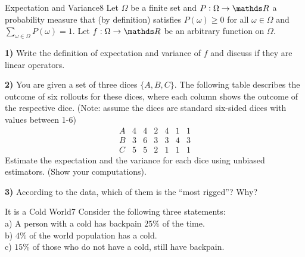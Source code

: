 \newif\ifvimbug
\vimbugfalse

\ifvimbug

\fi

 

\begin{questions}


\begin{question}{Expectation and Variance}{8}
Let $\Omega$ be a finite set and $P:\Omega\rightarrow\R$ a probability measure that (by definition) satisfies $P(\omega)\geq0$ for all $\omega\in\Omega$ and $\sum_{\omega\in\Omega}P(\omega)=1$. 
Let $f:\Omega\rightarrow\R$ be an arbitrary function on $\Omega$.

\textbf{1)} Write the definition of expectation and variance of $f$ and discuss if they are linear operators.

\textbf{2)} You are given a set of three dices $\{A,B,C\}$.
The following table describes the outcome of six rollouts for these dices, where each column shows the outcome of the respective dice. 
(Note: assume the dices are standard six-sided dices with values between 1-6)
\begin{equation*}
\begin{array}{r|cccccc}
    A & 4 & 4 & 2 & 4 & 1 & 1 \\
    \hline
    B & 3 & 6 & 3 & 3 & 4 & 3 \\
    \hline
    C & 5 & 5 & 2 & 1 & 1 & 1 
\end{array}
\end{equation*}
Estimate the expectation and the variance for each dice using unbiased estimators. (Show your computations).

\textbf{3)} According to the data, which of them is the ``most rigged''? Why?

\begin{answer}\end{answer}

\end{question}


\begin{question}{It is a Cold World}{7}
Consider the following three statements:
\\
a) A person with a cold has backpain $25\%$ of the time.
\\
b) $4\%$ of the world population has a cold.
\\
c) $15\%$ of those who do not have a cold, still have backpain.


\end{question}
\end{questions}
